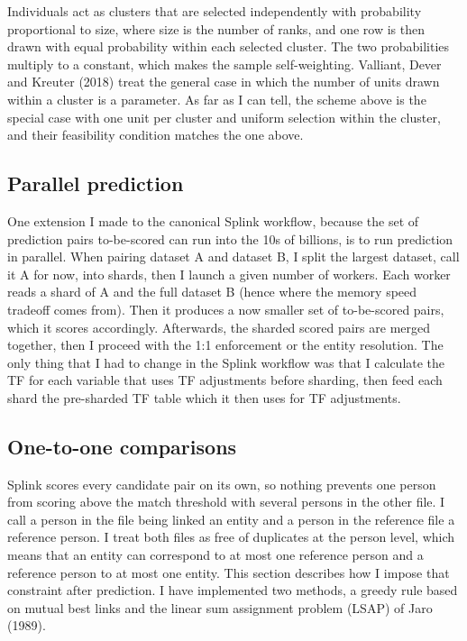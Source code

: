 \documentclass[11pt]{article}
\begin{document}
Individuals act as clusters that are selected independently with probability proportional to size, where size is the number of ranks, and one row is then drawn with equal probability within each selected cluster. The two probabilities multiply to a constant, which makes the sample self-weighting. Valliant, Dever and Kreuter (2018) treat the general case in which the number of units drawn within a cluster is a parameter. As far as I can tell, the scheme above is the special case with one unit per cluster and uniform selection within the cluster, and their feasibility condition matches the one above.

\subsection{Parallel prediction}

One extension I made to the canonical Splink workflow, because the set of prediction pairs to-be-scored can run into the 10s of billions, is to run prediction in parallel. When pairing dataset A and dataset B, I split the largest dataset, call it A for now, into shards, then I launch a given number of workers. Each worker reads a shard of A and the full dataset B (hence where the memory speed tradeoff comes from). Then it produces a now smaller set of to-be-scored pairs, which it scores accordingly. Afterwards, the sharded scored pairs are merged together, then I proceed with the 1:1 enforcement or the entity resolution. The only thing that I had to change in the Splink workflow was that I calculate the TF for each variable that uses TF adjustments before sharding, then feed each shard the pre-sharded TF table which it then uses for TF adjustments.

\subsection{One-to-one comparisons}

Splink scores every candidate pair on its own, so nothing prevents one person from scoring above the match threshold with several persons in the other file. I call a person in the file being linked an entity and a person in the reference file a reference person. I treat both files as free of duplicates at the person level, which means that an entity can correspond to at most one reference person and a reference person to at most one entity. This section describes how I impose that constraint after prediction. I have implemented two methods, a greedy rule based on mutual best links and the linear sum assignment problem (LSAP) of Jaro (1989).
\end{document}
